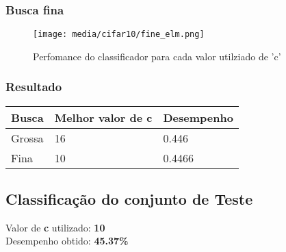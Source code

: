 \documentclass[a4paper]{article}
\begin{document}
\subsubsection{Busca fina}
\begin{figure}[H]
    \centering   %
    \centerline{\texttt{[image: media/cifar10/fine\_elm.png]}}
    \caption{Perfomance do classificador para cada valor utilziado de 'c'}  %
    \label{fig:fig2}  %
\end{figure}


\subsubsection{Resultado}

\begin{table}[H]
    \centering
    \begin{tabular}{|l|l|l|}
        \hline
        \textbf{Busca} & \textbf{Melhor valor de c} & \textbf{Desempenho} \\ \hline
        Grossa         & 16                         & 0.446               \\ \hline
        Fina           & 10                         & 0.4466              \\ \hline
    \end{tabular}
\end{table}

\subsection{Classificação do conjunto de Teste}

Valor de \textbf{c} utilizado: \textbf{10} \\
Desempenho obtido: \textbf{45.37\%}
\end{document}
